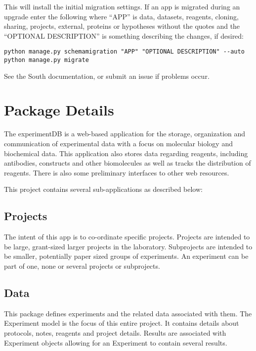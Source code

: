 \documentclass[letterpaper,10pt,english]{sphinxmanual}
\begin{document}
This will install the initial migration settings.  If an app is migrated during an upgrade enter the following where ``APP'' is data, datasets, reagents, cloning, sharing, projects, external, proteins or hypotheses without the quotes and the ``OPTIONAL DESCRIPTION'' is something describing the changes, if desired:


\begin{Verbatim}[commandchars=@\[\]]
python manage.py schemamigration "APP" "OPTIONAL DESCRIPTION" --auto
python manage.py migrate
\end{Verbatim}

See the South documentation, or submit an issue if problems occur.



\chapter{Package Details}
\label{api:module-experimentdb}\label{api:package-details}\label{api::doc}
The experimentDB is a web-based application for the storage, organization and communication of experimental data with a focus on molecular biology and biochemical data. This application also stores data regarding reagents, including antibodies, constructs and other biomolecules as well as tracks the distribution of reagents. There is also some preliminary interfaces to other web resources.


This project contains several sub-applications as described below:



\section{Projects}
\label{api:projects}
The intent of this app is to co-ordinate specific projects. Projects are intended to be large, grant-sized larger projects in the laboratory. Subprojects are intended to be smaller, potentially paper sized groups of experiments.  An experiment can be part of one, none or several projects or subprojects.



\section{Data}
\label{api:data}
This package defines experiments and the related data associated with them. The Experiment model is the focus of this entire project. It contains details about protocols, notes, reagents and project details. Results are associated with Experiment objects allowing for an Experiment to contain several results.
\end{document}
